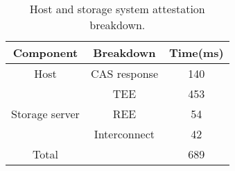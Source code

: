 \begin{table}
	{\small
    \centering
\begin{tabular}{ccc}
\toprule
{\bf  Component} & {\bf Breakdown} &  {\bf Time(ms)} \\
\midrule
Host & CAS response & 140 \\ 
\hline
\multirow{3}{*}{Storage server} & TEE & 453 \\
& REE & 54 \\
& Interconnect & 42 \\
\midrule
Total & & 689 \\
\bottomrule
\end{tabular}
}
\caption{\small Host and storage system attestation breakdown.\label{tab:attest-table}}
\vspace{-3mm}
\end{table}